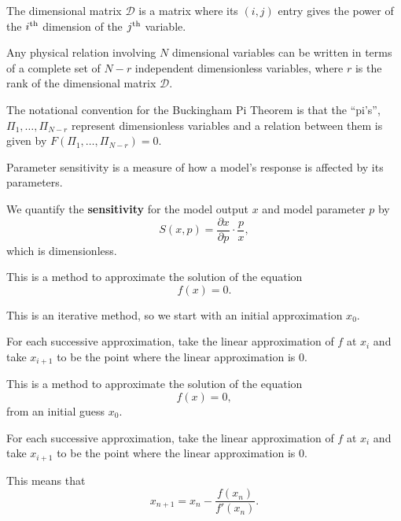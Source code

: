 \begin{SaveDefinition}[key=DimensionalMatrix, title={Dimensional Matrix}]
	The dimensional matrix $\mathcal{D}$ is a matrix where its $(i,j)$ entry gives the power of the $i^{\rm th}$ dimension of the $j^{\rm th}$ variable.
\end{SaveDefinition}

\begin{SaveDefinition}[key=BuckinghamPiThm, title={Buckingham Pi Theorem}]
	Any physical relation involving $N$ dimensional variables can be written in terms of a complete set of $N - r$ independent dimensionless variables, where $r$ is the rank of the dimensional matrix $\mathcal{D}$.
		
	The notational convention for the Buckingham Pi Theorem is that the ``pi's'', $\Pi_1,\ldots, \Pi_{N-r}$ represent dimensionless variables and a relation between them is given by $F(\Pi_1,\ldots,\Pi_{N-r}) = 0$.
\end{SaveDefinition}


\begin{SaveDefinition}[key=Sensitivity, title={Parameter Sensitivity}]

Parameter sensitivity is a measure of how a model's response is affected by its parameters.

We quantify the \textbf{sensitivity} for the model output $x$ and model parameter $p$ by
\[
S(x,p) = \frac{\partial x}{\partial p} \cdot \frac{p}{x},
\]
which is dimensionless.
\end{SaveDefinition}



\begin{SaveDefinition}[key=Newton1, title={Newton's Method}]

This is a method to approximate the solution of the equation
\[
f(x)=0.
\]

This is an iterative method, so we start with an initial approximation $x_0$.

For each successive approximation, take the linear approximation of $f$ at $x_i$ and take $x_{i+1}$ to be the point where the linear approximation is 0.
\end{SaveDefinition}


\begin{SaveDefinition}[key=Newton, title={Newton's Method}]

This is a method to approximate the solution of the equation
\[
f(x)=0,
\]
from an initial guess $x_0$.

For each successive approximation, take the linear approximation of $f$ at $x_i$ and take $x_{i+1}$ to be the point where the linear approximation is 0.

This means that 
\[
x_{n+1} = x_n - \frac{f(x_n)}{f'(x_n)}.
\]
\end{SaveDefinition}



